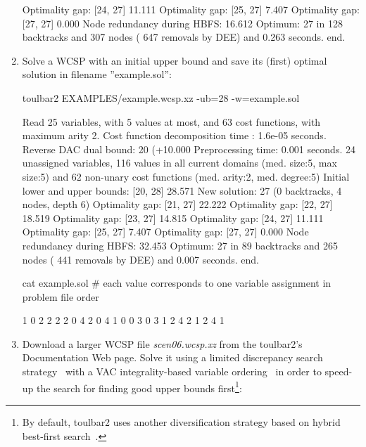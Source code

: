 \begin{enumerate}
{\begin{DoxyCode}
Optimality gap: [24, 27] 11.111 %
Optimality gap: [25, 27] 7.407 %
Optimality gap: [27, 27] 0.000 %
Node redundancy during HBFS: 16.612 %
Optimum: 27 in 128 backtracks and 307 nodes ( 647 removals by DEE) and 0.263 seconds.
end.
\end{DoxyCode}}
\item Solve a WCSP with an initial upper bound and save its (first) optimal solution
in filename ''example.sol'':
\begin{DoxyCode}
	toulbar2 EXAMPLES/example.wcsp.xz -ub=28 -w=example.sol
\end{DoxyCode}
{\scriptsize
\begin{DoxyCode}
Read 25 variables, with 5 values at most, and 63 cost functions, with maximum arity 2.
Cost function decomposition time : 1.6e-05 seconds.
Reverse DAC dual bound: 20 (+10.000%
Preprocessing time: 0.001 seconds.
24 unassigned variables, 116 values in all current domains (med. size:5, max size:5) and 62 non-unary cost functions (med. arity:2, med. degree:5)
Initial lower and upper bounds: [20, 28] 28.571%
New solution: 27 (0 backtracks, 4 nodes, depth 6)
Optimality gap: [21, 27] 22.222 %
Optimality gap: [22, 27] 18.519 %
Optimality gap: [23, 27] 14.815 %
Optimality gap: [24, 27] 11.111 %
Optimality gap: [25, 27] 7.407 %
Optimality gap: [27, 27] 0.000 %
Node redundancy during HBFS: 32.453 %
Optimum: 27 in 89 backtracks and 265 nodes ( 441 removals by DEE) and 0.007 seconds.
end.
\end{DoxyCode}}
\begin{DoxyCode}
cat example.sol
# each value corresponds to one variable assignment in problem file order
\end{DoxyCode}
{\scriptsize
\begin{DoxyCode}
1 0 2 2 2 2 0 4 2 0 4 1 0 0 3 0 3 1 2 4 2 1 2 4 1
\end{DoxyCode}}
\item Download a larger WCSP file {\em scen06.wcsp.xz} from the toulbar2's Documentation Web page. Solve it using a limited discrepancy search strategy~\cite{Ginsberg95} with a VAC integrality-based variable ordering~\cite{Trosser20a} in order to speed-up the search for finding good upper bounds first\footnote{By default, toulbar2 uses another diversification strategy based on hybrid best-first search~\cite{Katsirelos15a}.}:

\end{enumerate}
